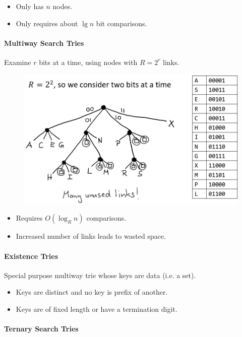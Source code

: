 \documentclass[twocolumn,english]{article}
\numberwithin{equation}{section}
\numberwithin{figure}{section}
\numberwithin{table}{section}
\begin{document}
\begin{itemize}
\item Only has $n$ nodes. 
\item Only requires about $\lg n$ bit comparisons. 
\end{itemize}

\paragraph{Multiway Search Tries}

Examine $r$ bits at a time, using nodes with $R=2^{r}$ links.

\begin{figure}[H]
\centering{}\includegraphics[width=0.75\linewidth]{img/multiwayst} 
\end{figure}

\begin{itemize}
\item Requires $O\left(\log_{R}n\right)$ comparisons. 
\item Increased number of links leads to wasted space. 
\end{itemize}

\paragraph{Existence Tries}

Special purpose multiway trie whose keys are data (i.e. a set). 
\begin{itemize}
\item Keys are distinct and no key is prefix of another. 
\item Keys are of fixed length or have a termination digit. 
\end{itemize}

\paragraph{Ternary Search Tries}
\end{document}
